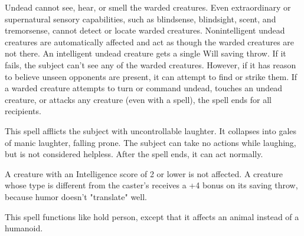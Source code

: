\begin{multicols}{2}
\begin{small}
\noindent Undead cannot see, hear, or smell the warded creatures. Even extraordinary or supernatural sensory capabilities, such as blindsense, blindsight, scent, and tremorsense, cannot detect or locate warded creatures. Nonintelligent undead creatures are automatically affected and act as though the warded creatures are not there. An intelligent undead creature gets a single Will saving throw. If it fails, the subject can't see any of the warded creatures. However, if it has reason to believe unseen opponents are present, it can attempt to find or strike them. If a warded creature attempts to turn or command undead, touches an undead creature, or attacks any creature (even with a spell), the spell ends for all recipients.

\noindent This spell afflicts the subject with uncontrollable laughter. It collapses into gales of manic laughter, falling prone. The subject can take no actions while laughing, but is not considered helpless. After the spell ends, it can act normally.

\smallskip\noindent A creature with an Intelligence score of 2 or lower is not affected. A creature whose type is different from the caster's receives a +4 bonus on its saving throw, because humor doesn't "translate" well.


\noindent This spell functions like hold person, except that it affects an animal instead of a humanoid.


\end{small}
\end{multicols}
